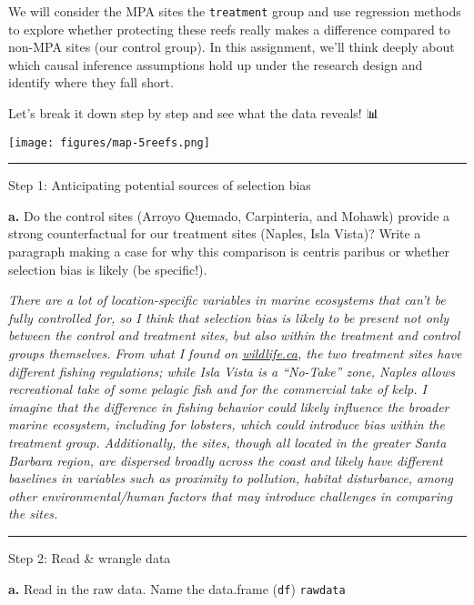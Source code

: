 \documentclass[
]{article}
\begin{document}
We will consider the MPA sites the \texttt{treatment} group and use
regression methods to explore whether protecting these reefs really
makes a difference compared to non-MPA sites (our control group). In
this assignment, we'll think deeply about which causal inference
assumptions hold up under the research design and identify where they
fall short.

Let's break it down step by step and see what the data reveals! 📊

\texttt{[image: figures/map-5reefs.png]}

\begin{center}\rule{0.5\linewidth}{0.5pt}\end{center}

Step 1: Anticipating potential sources of selection bias

\textbf{a.} Do the control sites (Arroyo Quemado, Carpinteria, and
Mohawk) provide a strong counterfactual for our treatment sites (Naples,
Isla Vista)? Write a paragraph making a case for why this comparison is
centris paribus or whether selection bias is likely (be specific!).

\emph{There are a lot of location-specific variables in marine
ecosystems that can't be fully controlled for, so I think that selection
bias is likely to be present not only between the control and treatment
sites, but also within the treatment and control groups themselves. From
what I found on
\href{https://wildlife.ca.gov/Conservation/Marine/MPAs/Naples}{wildlife.ca},
the two treatment sites have different fishing regulations; while Isla
Vista is a ``No-Take'' zone, Naples allows recreational take of some
pelagic fish and for the commercial take of kelp. I imagine that the
difference in fishing behavior could likely influence the broader marine
ecosystem, including for lobsters, which could introduce bias within the
treatment group. Additionally, the sites, though all located in the
greater Santa Barbara region, are dispersed broadly across the coast and
likely have different baselines in variables such as proximity to
pollution, habitat disturbance, among other environmental/human factors
that may introduce challenges in comparing the sites.}

\begin{center}\rule{0.5\linewidth}{0.5pt}\end{center}

Step 2: Read \& wrangle data

\textbf{a.} Read in the raw data. Name the data.frame (\texttt{df})
\texttt{rawdata}
\end{document}
